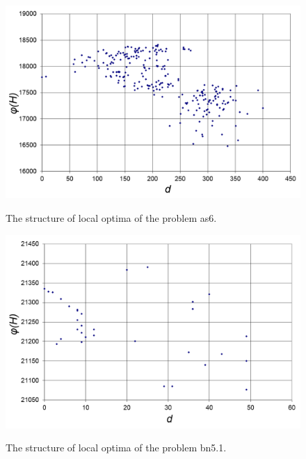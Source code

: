 \documentclass{ifacconf}
\begin{document}
\begin{figure}[h!]
	\begin{center}
		\includegraphics[scale=0.2]{klaster_as4.png}\\
		\caption{The structure of local optima of the problem as6.} \label{klaster_as4}
	\end{center}
\end{figure} 
\begin{figure}[h!]
	\vspace{-1cm}
	\begin{center}
		\includegraphics[scale=0.2]{klaster_bn5_1.png}\\
		\caption{The structure of local optima of the problem bn5.1.} \label{klaster_bn5_1}
	\end{center}
	\vspace{-1cm}
\end{figure} 
\end{document}
